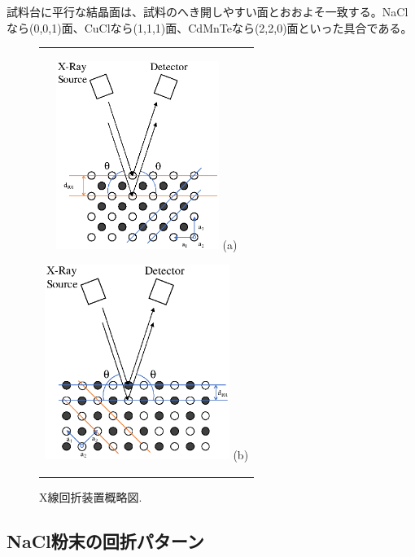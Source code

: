 \documentclass[11pt,a4j,uplatex]{jsarticle}
\begin{document}
試料台に平行な結晶面は、試料のへき開しやすい面とおおよそ一致する。NaClなら(0,0,1)面、CuClなら(1,1,1)面、CdMnTeなら(2,2,0)面といった具合である。

\begin{figure}[ht]
 \centering
 \begin{tabular}{c}

  \begin{minipage}{0.5\hsize}
   \centering
   \includegraphics[clip, width=5.3cm]{2theta.eps}
   \hspace{2cm} (a)
  \end{minipage}

  \begin{minipage}{0.5\hsize}
   \centering
   \includegraphics[clip, width=6cm]{2theta3.eps}
   \hspace{2cm} (b)
  \end{minipage}
 \end{tabular}
 \caption{X線回折装置概略図.}
 \label{thetatheta}

\end{figure}

\newpage
\subsection{NaCl粉末の回折パターン}
\end{document}
